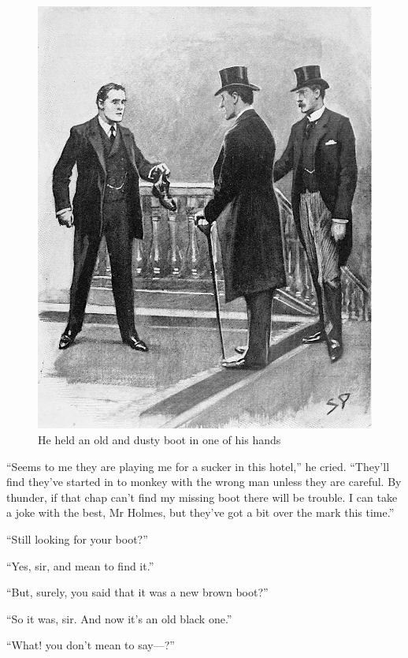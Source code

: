 \documentclass[paper=5.5in:8.5in,BCOR=7mm,twoside,DIV=calc,12pt,usegeometry,openany,chapterprefix,endperiod]{scrbook} %
\begin{document}
\begin{figure}[tbph]
\centering
\includegraphics[width=\linewidth]{05_oldboot}
\caption{He held an old and dusty boot in one of his hands}
\end{figure}


\enquote{Seems to me they are playing me for a sucker in this hotel,} he cried. \enquote{They'll find they've started in to monkey with the wrong man unless they are careful. By thunder, if that chap can't find my missing boot there will be trouble. I can take a joke with the best, Mr Holmes, but they've got a bit over the mark this time.}

\enquote{Still looking for your boot?}

\enquote{Yes, sir, and mean to find it.}

\enquote{But, surely, you said that it was a new brown boot?}

\enquote{So it was, sir. And now it's an old black one.}

\enquote{What! you don't mean to say\nobreakdash---?}
\end{document}
